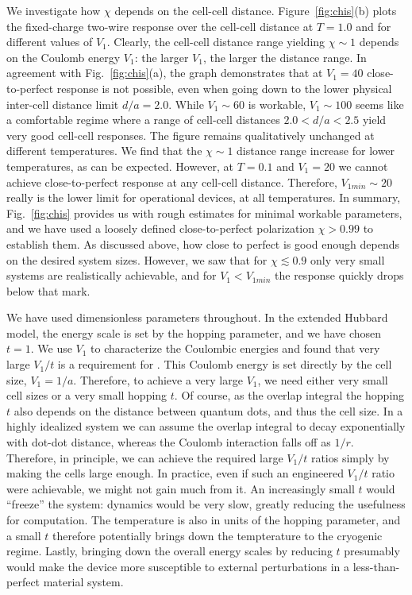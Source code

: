 We investigate how $\chi$ depends on the cell-cell distance.
Figure~\ref{fig:chis}(b) plots the fixed-charge two-wire response over the
cell-cell distance at $T = 1.0$ and for different values of $V_1$. Clearly, the
cell-cell distance range yielding $\chi \sim 1$ depends on the Coulomb energy
$V_1$: the larger $V_1$, the larger the distance range. In agreement with
Fig.~\ref{fig:chis}(a), the graph demonstrates that at $V_1 = 40$
close-to-perfect response is not possible, even when going down to the lower
physical inter-cell distance limit $d/a = 2.0$. While $V_1 \sim 60$ is workable,
$V_1 \sim 100$ seems like a comfortable regime where a range of cell-cell
distances $2.0 < d/a <2.5$ yield very good cell-cell responses. The figure
remains qualitatively unchanged at different temperatures. We find that the
$\chi \sim 1$ distance range increase for lower temperatures, as can be
expected. However, at $T = 0.1$ and $V_1 = 20$ we cannot achieve
close-to-perfect response at any cell-cell distance. Therefore, $V_{1min} \sim
20$ really is the lower limit for operational  devices, at all
temperatures. In summary, Fig.~\ref{fig:chis} provides us with rough estimates
for minimal workable parameters, and we have used a loosely defined
close-to-perfect polarization $\chi > 0.99$ to establish them. As discussed
above, how close to perfect is good enough depends on the desired system sizes.
However, we saw that for $\chi \lesssim 0.9$ only very small systems are
realistically achievable, and for $V_1 < V_{1min}$ the response quickly drops
below that mark.

We have used dimensionless parameters throughout. In the extended Hubbard model,
the energy scale is set by the hopping parameter, and we have chosen $t = 1$. We
use $V_1$ to characterize the Coulombic energies and found that very large
$V_1/t$ is a requirement for . This Coulomb energy is set directly by
the cell size, $V_1 = 1/a$. Therefore, to achieve a very large $V_1$, we need
either very small cell sizes or a very small hopping $t$. Of course, as the
overlap integral the hopping $t$ also depends on the distance between quantum
dots, and thus the cell size. In a highly idealized system we can assume the
overlap integral to decay exponentially with dot-dot distance, whereas the
Coulomb interaction falls off as $1/r$. Therefore, in principle, we can achieve
the required large $V_1/t$ ratios simply by making the  cells large
enough. In practice, even if such an engineered $V_1/t$ ratio were achievable,
we might not gain much from it. An increasingly small $t$ would ``freeze'' the
system: dynamics would be very slow, greatly reducing the usefulness for
computation. The temperature is also in units of the hopping parameter, and a
small $t$ therefore potentially brings down the tempterature to the cryogenic
regime. Lastly, bringing down the overall energy scales by reducing $t$
presumably would make the device more susceptible to external perturbations in a
less-than-perfect material system.

